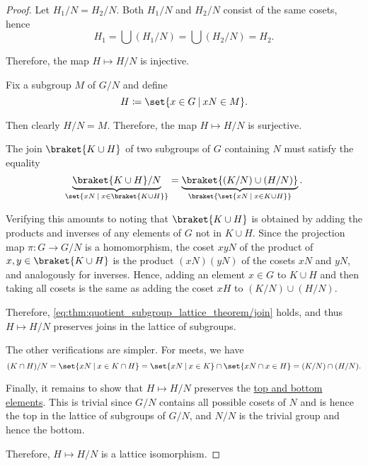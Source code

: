 \begin{proof}
   Let \( H_1 / N = H_2 / N \). Both \( H_1 / N \) and \( H_2 / N \) consist of the same cosets, hence
  \begin{equation*}
    H_1 = \bigcup (H_1 / N) = \bigcup (H_2 / N) = H_2.
  \end{equation*}

  Therefore, the map \( H \mapsto H / N \) is injective.

   Fix a subgroup \( M \) of \( G / N \) and define
  \begin{equation*}
    H \coloneqq \set{ x \in G \given xN \in M }.
  \end{equation*}

  Then clearly \( H / N = M \). Therefore, the map \( H \mapsto H / N \) is surjective.

   The join \( \braket{ K \cup H } \) of two subgroups of \( G \) containing \( N \) must satisfy the equality
  \begin{equation}\label{eq:thm:quotient_subgroup_lattice_theorem/join}
    \underbrace{ \braket{ K \cup H } / N }_{\set{ xN \given x \in \braket{ K \cup H } }}
    =
    \underbrace{ \braket{ (K / N) \cup (H / N) } }_{\braket{ \set{ xN \given x \in K \cup H } }}.
  \end{equation}

  Verifying this amounts to noting that \( \braket{ K \cup H } \) is obtained by adding the products and inverses of any elements of \( G \) not in \( K \cup H \). Since the projection map \( \pi: G \to G / N \) is a homomorphism, the coset \( xy N \) of the product of \( x, y \in \braket{ K \cup H } \) is the product \( (xN) (yN) \) of the cosets \( xN \) and \( yN \), and analogously for inverses. Hence, adding an element \( x \in G \) to \( K \cup H \) and then taking all cosets is the same as adding the coset \( xH \) to \( (K / N) \cup (H / N) \).

  Therefore, \eqref{eq:thm:quotient_subgroup_lattice_theorem/join} holds, and thus \( H \mapsto H / N \) preserves joins in the lattice of subgroups.

  The other verifications are simpler. For meets, we have
  \begin{equation*}
    (K \cap H) / N
    =
    \set{ xN \given x \in K \cap H }
    =
    \set{ xN \given x \in K } \cap \set{ xN \cap x \in H }
    =
    (K / N) \cap (H / N).
  \end{equation*}

  Finally, it remains to show that \( H \mapsto H / N \) preserves the \hyperref[def:partially_ordered_set_extremal_points/top_and_bottom]{top and bottom elements}. This is trivial since \( G / N \) contains all possible cosets of \( N \) and is hence the top in the lattice of subgroups of \( G / N \), and \( N / N \) is the trivial group and hence the bottom.

  Therefore, \( H \mapsto H / N \) is a lattice isomorphism.
\end{proof}


